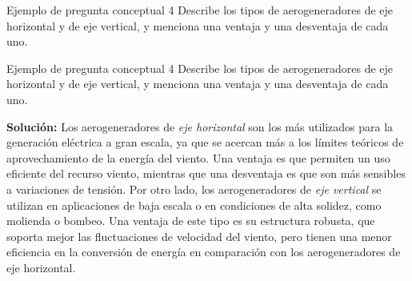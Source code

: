\documentclass[
    10pt,
    aspectratio=169,
    xcolor={dvipsnames},
    spanish,
    ]{beamer}
\begin{document}
\begin{frame}
  \begin{block}{Ejemplo de pregunta conceptual 4}
    Describe los tipos de aerogeneradores de eje horizontal y de eje vertical, y menciona una ventaja y una desventaja de cada uno.
  \end{block}
\end{frame}
\begin{frame}
  \begin{block}{Ejemplo de pregunta conceptual 4}
    Describe los tipos de aerogeneradores de eje horizontal y de eje vertical, y menciona una ventaja y una desventaja de cada uno.
  \end{block}
\textbf{Solución:} Los aerogeneradores de \textit{eje horizontal} son los más utilizados para la generación eléctrica a gran escala, ya que se acercan más a los límites teóricos de aprovechamiento de la energía del viento. Una ventaja es que permiten un uso eficiente del recurso viento, mientras que una desventaja es que son más sensibles a variaciones de tensión. Por otro lado, los aerogeneradores de \textit{eje vertical} se utilizan en aplicaciones de baja escala o en condiciones de alta solidez, como molienda o bombeo. Una ventaja de este tipo es su estructura robusta, que soporta mejor las fluctuaciones de velocidad del viento, pero tienen una menor eficiencia en la conversión de energía en comparación con los aerogeneradores de eje horizontal.
\end{frame}
\end{document}
